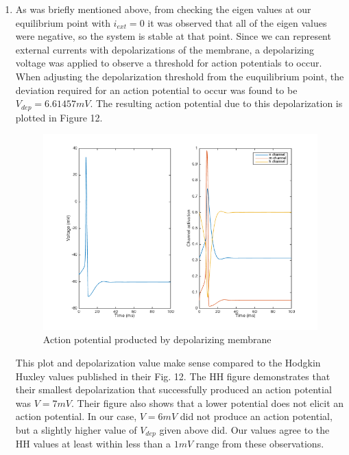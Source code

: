 \documentclass[10pt]{report}
\begin{document}
\begin{enumerate}
\item As was briefly mentioned above, from checking the eigen values at our equilibrium point with $i_{ext} = 0$ it was observed that all of the eigen values were negative, so the system is stable at that point. Since we can represent external currents with depolarizations of the membrane, a depolarizing voltage was applied to observe a threshold for action potentials to occur. When adjusting the depolarization threshold from the euquilibrium point, the deviation required for an action potential to occur was found to be $V_{dep} = 6.61457 mV$. The resulting action potential due to this depolarization is plotted in Figure 12. \begin{figure}[h!] \includegraphics[scale=0.53]{motnq14.png} \caption[h12]{Action potential producted by depolarizing membrane} \end{figure} This plot and depolarization value make sense compared to the Hodgkin Huxley values published in their Fig. 12. The HH figure demonstrates that their smallest depolarization that successfully produced an action potential was $V = 7 mV$. Their figure also shows that a lower potential does not elicit an action potential. In our case, $V = 6 mV$ did not produce an action potential, but a slightly higher value of $V_{dep}$ given above did. Our values agree to the HH values at least within less than a $1 mV$ range from these observations.
%
%
\\

\end{enumerate}
\end{document}
